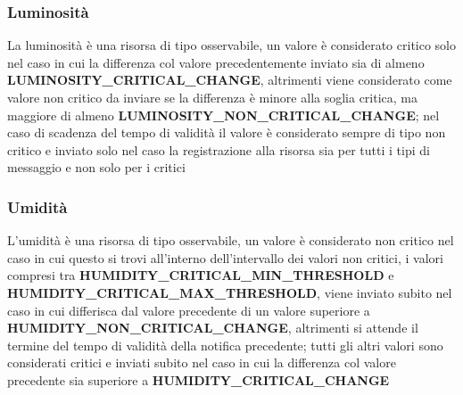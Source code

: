         

      \subsubsection{Luminosità}
        La luminosità è una risorsa di tipo osservabile, un valore è considerato critico solo nel caso in cui la differenza col valore precedentemente inviato sia di almeno \textbf{LUMINOSITY\_CRITICAL\_CHANGE}, altrimenti viene considerato come valore non critico da inviare se la differenza è minore alla soglia critica, ma maggiore
        di almeno \textbf{LUMINOSITY\_NON\_CRITICAL\_CHANGE}; nel caso di scadenza del tempo di validità il valore è considerato sempre di tipo non critico e inviato
        solo nel caso la registrazione alla risorsa sia per tutti i tipi di messaggio e non solo per i critici

      \subsubsection{Umidità}
        L'umidità è una risorsa di tipo osservabile, un valore è considerato non critico nel caso in cui questo si trovi all'interno dell'intervallo dei valori non critici,
        i valori compresi tra \textbf{HUMIDITY\_CRITICAL\_MIN\_THRESHOLD} e \textbf{HUMIDITY\_CRITICAL\_MAX\_THRESHOLD}, viene inviato subito nel caso in cui differisca dal
        valore precedente di un valore superiore a \textbf{HUMIDITY\_NON\_CRITICAL\_CHANGE}, altrimenti si attende il termine del tempo di validità della notifica precedente;
        tutti gli altri valori sono considerati critici e inviati subito nel caso in cui la differenza col valore precedente sia superiore a \textbf{HUMIDITY\_CRITICAL\_CHANGE}
